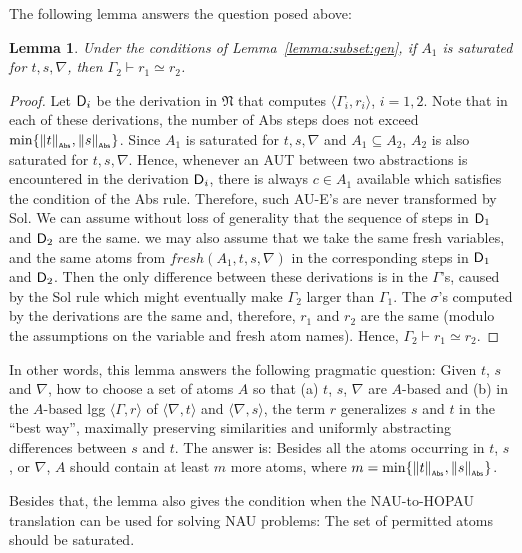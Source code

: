 \documentclass[11pt,a4paper]{amsart}
\newtheorem{lemma}{Lemma}
\theoremstyle{definition}
\newcommand{\frN}{\mathfrak N}
\newcommand{\np}[2]{\langle #1, \allowbreak #2\rangle}
\newcommand{\abscard}[1]{\|#1\|_{_{\sf Abs}}}
\newcommand{\unused}{\mathit{fresh}}
\begin{document}
The following lemma answers the question posed above:
\begin{lemma}
  \label{lemma:saturation}
  Under the conditions of Lemma~\ref{lemma:subset:gen}, if $A_1$ is
  saturated for $t,s,\nabla$, then $\Gamma_2\vdash r_1\simeq r_2$. 
\end{lemma}
\begin{proof}
  Let ${\sf D}_i$ be the derivation in $\frN$ that computes
  $\np{\Gamma_i}{r_i}$, $i=1,2$. Note that in each of these
  derivations, the number of \textsf{Abs} steps does not exceed
  $\min\{\abscard{t},\abscard{s}\}$. Since $A_1$ is saturated for
  $t,s,\nabla$ and $A_1\subseteq A_2$, $A_2$ is also saturated for
  $t,s,\nabla$. Hence, whenever an AUT between two abstractions is
  encountered in the derivation ${\sf D}_i$, there is always $c\in
  A_1$ available which satisfies the condition of the \textsf{Abs}
  rule. Therefore, such AU-E's are never transformed by
  \textsf{Sol}. We can assume without loss of generality that the
  sequence of steps in ${\sf D}_1$ and ${\sf D}_2$ are the same. we
  may also assume that we take the same fresh variables, and the same
  atoms from $\unused(A_1,t,s,\nabla)$ in the corresponding steps in
  ${\sf D}_1$ and ${\sf D}_2$. Then the only difference between these
  derivations is in the $\Gamma$'s, caused by the \textsf{Sol} rule
  which might eventually make $\Gamma_2$ larger than $\Gamma_1$. The
  $\sigma$'s computed by the derivations are the same and, therefore,
  $r_1$ and $r_2$ are the same (modulo the assumptions on the variable
  and fresh atom names). Hence, $\Gamma_2 \vdash r_1 \simeq r_2$.
\end{proof}

In other words, this lemma answers the following pragmatic question:
Given $t$, $s$ and $\nabla$, how to choose a set of atoms $A$ so that
(a) $t$, $s$, $\nabla$ are $A$-based and (b) in the $A$-based lgg
$\np{\Gamma}{r}$ of $\np{\nabla}{t}$ and $\np{\nabla}{s}$, the term
$r$ generalizes $s$ and $t$ in the ``best way'', maximally preserving
similarities and uniformly abstracting differences between $s$ and
$t$. The answer is: Besides all the atoms occurring in $t$, $s$, or
$\nabla$, $A$ should contain at least $m$ more atoms, where
$m=\min\{\abscard{t},\abscard{s}\}$.

Besides that, the lemma also gives the condition when the NAU-to-HOPAU translation can be used for solving NAU problems: The set of permitted atoms should be saturated. 
\end{document}
